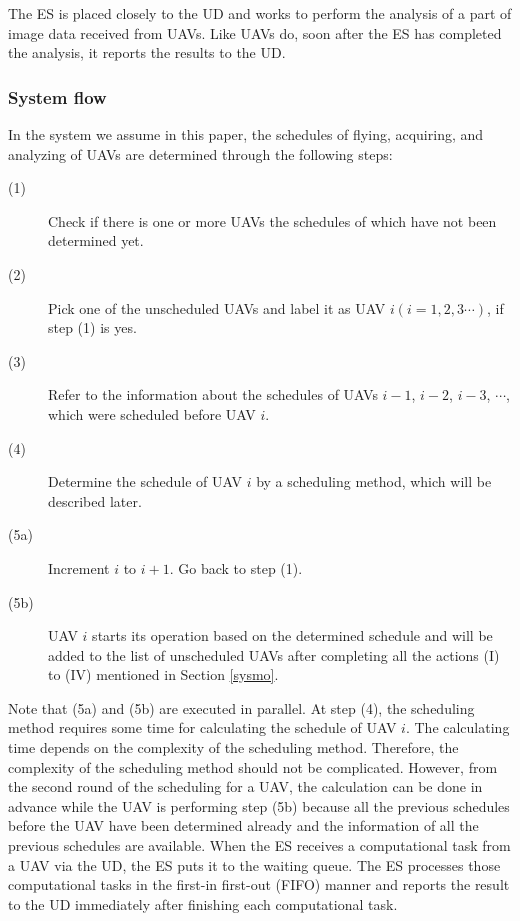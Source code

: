 \documentclass[journal]{IEEEtran}
\begin{document}
The ES is placed closely to the UD and works to perform the analysis of a part of image data received from UAVs.
%
Like UAVs do, soon after the ES has completed the analysis, it reports the results to the UD.
%

\subsubsection{System flow}\label{flow}
In the system we assume in this paper, the schedules of flying, acquiring, and analyzing of UAVs are determined through the following steps:
%
\begin{description}
\item[(1)] Check if there is one or more UAVs the schedules of which have not been determined yet.
\item[(2)] Pick one of the unscheduled UAVs and label it as UAV $i (i=1, 2, 3\cdots)$, if step (1) is yes.
\item[(3)] Refer to the information about the schedules of UAVs $i-1$, $i-2$, $i-3$, $\cdots$, which were scheduled before UAV $i$.
\item[(4)] Determine the schedule of UAV $i$ by a scheduling method, which will be described later.
\item[(5a)] Increment $i$ to $i+1$. Go back to step (1).
\item[(5b)] UAV $i$ starts its operation based on the determined schedule and will be added to the list of unscheduled UAVs after completing all the actions (I) to (I\hspace{-.1em}V) mentioned in Section \ref{sysmo}.
\end{description}
%
Note that (5a) and (5b) are executed in parallel.
%
At step (4), the scheduling method requires some time for calculating the schedule of UAV $i$.
%
The calculating time depends on the complexity of the scheduling method.
%
Therefore, the complexity of the scheduling method should not be complicated.
%
However, from the second round of the scheduling for a UAV, the calculation can be done in advance while the UAV is performing step (5b) because all the previous schedules before the UAV have been determined already and the information of all the previous schedules are available.
%
%
When the ES receives a computational task from a UAV via the UD, the ES puts it to the waiting queue.
%
The ES processes those computational tasks in the first-in first-out (FIFO) manner and reports the result to the UD immediately after finishing each computational task.
\end{document}
